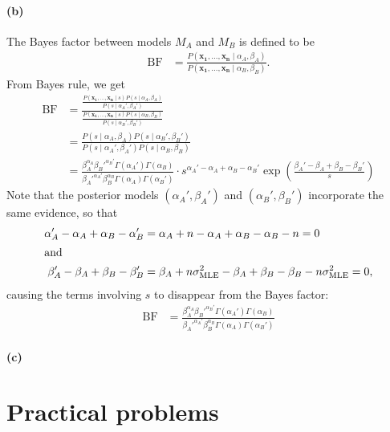 \documentclass[a4paper,11pt]{article}
\DeclareMathOperator{\given}{\mid}
\begin{document}
\paragraph{(b)} The Bayes factor between models $M_A$ and $M_B$ is defined to be
\begin{align*}
\mathrm{BF}&=
  \frac{
    P(\mathbf{x_1},\dots,\mathbf{x_n}\given\alpha_A,\beta_A)
  }{
    P(\mathbf{x_1},\dots,\mathbf{x_n}\given\alpha_B,\beta_B)
  }.
\end{align*}
From Bayes rule, we get
\begin{align*}
\mathrm{BF}&=
  \frac{
    \frac{
      P(\mathbf{x_1},\dots,\mathbf{x_n}\given s)P(s\given\alpha_A,\beta_A)      
    }{
      P(s\given\alpha_A',\beta_A')
    }
  }{
    \frac{
      P(\mathbf{x_1},\dots,\mathbf{x_n}\given s)P(s\given\alpha_B,\beta_B)      
    }{
      P(s\given\alpha_B',\beta_B')
    }
  }\\
&=
  \frac{
    P(s\given\alpha_A,\beta_A)P(s\given\alpha_B',\beta_B')
  }{
    P(s\given\alpha_A',\beta_A')P(s\given\alpha_B,\beta_B)
  }\\
&=
  \frac{
    \beta_A^{\alpha_A}\beta_B'^{\alpha_B'}
    \Gamma(\alpha_A')\Gamma(\alpha_B)
  }{
    \beta_A'^{\alpha_A'}\beta_B^{\alpha_B}
    \Gamma(\alpha_A)\Gamma(\alpha_B')
  }
  \cdot
  s^{\alpha_A'-\alpha_A+\alpha_B-\alpha_B'}
  \exp\left(
    \frac{
      \beta_A'-\beta_A+\beta_B-\beta_B'
    }{
      s
    }
  \right)
\end{align*}
Note that the posterior models $(\alpha_A', \beta_A')$ and $(\alpha_B', \beta_B')$ incorporate the same evidence, so that
\begin{align*}
  \alpha_A'-\alpha_A+\alpha_B-\alpha_B'&=
  \alpha_A+n-\alpha_A+\alpha_B-\alpha_B-n=0\\
  \intertext{and}
  \beta_A'-\beta_A+\beta_B-\beta_B'&=
  \beta_A+n\sigma_\mathrm{MLE}^2-\beta_A+\beta_B-\beta_B-n\sigma_\mathrm{MLE}^2=0,
\end{align*}
causing the terms involving $s$ to disappear from the Bayes factor:
\begin{align*}
\mathrm{BF}&=
  \frac{
    \beta_A^{\alpha_A}\beta_B'^{\alpha_B'}
    \Gamma(\alpha_A')\Gamma(\alpha_B)
  }{
    \beta_A'^{\alpha_A'}\beta_B^{\alpha_B}
    \Gamma(\alpha_A)\Gamma(\alpha_B')
  }
\end{align*}
\paragraph{(c)}

\section{Practical problems}
\end{document}
